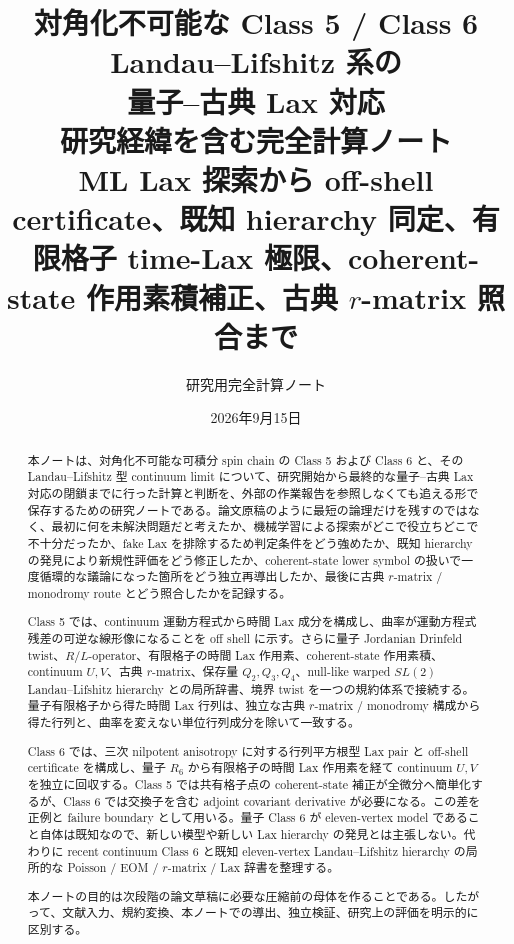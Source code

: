 \documentclass[a4paper,11pt]{ltjsarticle}
\title{\vspace{-1.2em}\bfseries 対角化不可能な Class 5 / Class 6 Landau--Lifshitz 系の\\量子--古典 Lax 対応\\[2mm]
\large 研究経緯を含む完全計算ノート\\[1mm]
\normalsize ML Lax 探索から off-shell certificate、既知 hierarchy 同定、有限格子 time-Lax 極限、coherent-state 作用素積補正、古典 $r$-matrix 照合まで}
\author{研究用完全計算ノート}
\date{2026年9月15日}
\numberwithin{equation}{section}
\begin{document}
\maketitle
\thispagestyle{plain}

\begin{abstract}
本ノートは、対角化不可能な可積分 spin chain の Class 5 および Class 6 と、その Landau--Lifshitz 型 continuum limit について、研究開始から最終的な量子--古典 Lax 対応の閉鎖までに行った計算と判断を、外部の作業報告を参照しなくても追える形で保存するための研究ノートである。論文原稿のように最短の論理だけを残すのではなく、最初に何を未解決問題だと考えたか、機械学習による探索がどこで役立ちどこで不十分だったか、fake Lax を排除するため判定条件をどう強めたか、既知 hierarchy の発見により新規性評価をどう修正したか、coherent-state lower symbol の扱いで一度循環的な議論になった箇所をどう独立再導出したか、最後に古典 $r$-matrix / monodromy route とどう照合したかを記録する。

Class 5 では、continuum 運動方程式から時間 Lax 成分を構成し、曲率が運動方程式残差の可逆な線形像になることを off shell に示す。さらに量子 Jordanian Drinfeld twist、$R/L$-operator、有限格子の時間 Lax 作用素、coherent-state 作用素積、continuum $U,V$、古典 $r$-matrix、保存量 $Q_2,Q_3,Q_4$、null-like warped $SL(2)$ Landau--Lifshitz hierarchy との局所辞書、境界 twist を一つの規約体系で接続する。量子有限格子から得た時間 Lax 行列は、独立な古典 $r$-matrix / monodromy 構成から得た行列と、曲率を変えない単位行列成分を除いて一致する。

Class 6 では、三次 nilpotent anisotropy に対する行列平方根型 Lax pair と off-shell certificate を構成し、量子 $R_6$ から有限格子の時間 Lax 作用素を経て continuum $U,V$ を独立に回収する。Class 5 では共有格子点の coherent-state 補正が全微分へ簡単化するが、Class 6 では交換子を含む adjoint covariant derivative が必要になる。この差を正例と failure boundary として用いる。量子 Class 6 が eleven-vertex model であること自体は既知なので、新しい模型や新しい Lax hierarchy の発見とは主張しない。代わりに recent continuum Class 6 と既知 eleven-vertex Landau--Lifshitz hierarchy の局所的な Poisson / EOM / $r$-matrix / Lax 辞書を整理する。

本ノートの目的は次段階の論文草稿に必要な圧縮前の母体を作ることである。したがって、文献入力、規約変換、本ノートでの導出、独立検証、研究上の評価を明示的に区別する。
\end{abstract}

\clearpage
\begingroup\small\setlength{\parskip}{0pt}\tableofcontents\endgroup
\clearpage

















\end{document}
